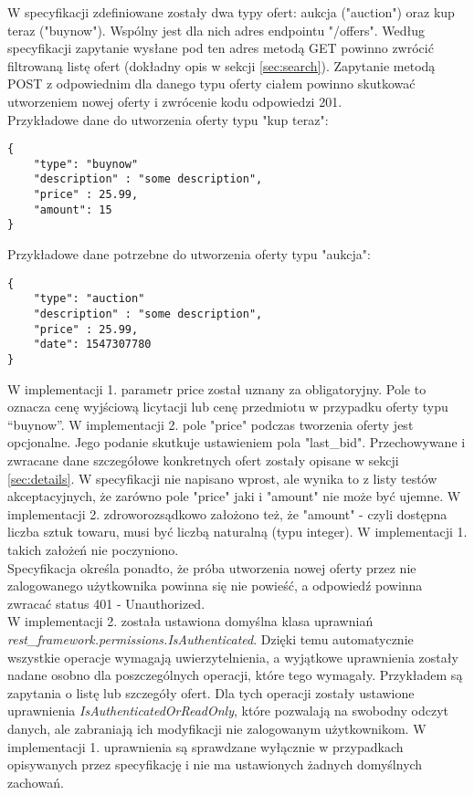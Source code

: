 \documentclass[12pt, notitlepage]{article}
\begin{document}
W specyfikacji zdefiniowane zostały dwa typy ofert: aukcja ("auction") oraz kup teraz ("buynow"). Wspólny jest dla nich adres endpointu "/offers". Według specyfikacji zapytanie wysłane pod ten adres metodą GET powinno zwrócić filtrowaną listę ofert (dokładny opis w sekcji \ref{sec:search}). Zapytanie metodą POST z odpowiednim dla danego typu oferty ciałem powinno skutkować utworzeniem nowej oferty i zwrócenie kodu odpowiedzi 201. \\

Przykładowe dane do utworzenia oferty typu "kup teraz":
\begin{lstlisting}
{     
    "type": "buynow"
    "description" : "some description",
    "price" : 25.99,
    "amount": 15
}
\end{lstlisting}

Przykładowe dane potrzebne do utworzenia oferty typu "aukcja":
\begin{lstlisting}
{     
    "type": "auction"
    "description" : "some description",
    "price" : 25.99,
    "date": 1547307780
}
\end{lstlisting}

W implementacji 1. parametr price został uznany za obligatoryjny. Pole to oznacza cenę wyjściową licytacji lub cenę przedmiotu w przypadku oferty typu ``buynow''. W implementacji 2. pole "price" podczas tworzenia oferty jest opcjonalne. Jego podanie skutkuje ustawieniem pola "last\_bid". Przechowywane i zwracane dane szczegółowe konkretnych ofert zostały opisane w sekcji \ref{sec:details}. W specyfikacji nie napisano wprost, ale wynika to z listy testów akceptacyjnych, że zarówno pole "price" jaki i "amount" nie może być ujemne. W implementacji 2. zdroworozsądkowo założono też, że "amount" - czyli dostępna liczba sztuk towaru, musi być liczbą naturalną (typu integer). W implementacji 1. takich założeń nie poczyniono. \\

Specyfikacja określa ponadto, że próba utworzenia nowej oferty przez nie zalogowanego użytkownika powinna się nie powieść, a odpowiedź powinna zwracać status 401 - Unauthorized. \\
W implementacji 2. została ustawiona domyślna klasa uprawniań \newline \textit{rest\_framework.permissions.IsAuthenticated}. Dzięki temu automatycznie wszystkie operacje wymagają uwierzytelnienia, a wyjątkowe uprawnienia zostały nadane osobno dla poszczególnych operacji, które tego wymagały. Przykładem są zapytania o listę lub szczegóły ofert. Dla tych operacji zostały ustawione uprawnienia \textit{IsAuthenticatedOrReadOnly}, które pozwalają na swobodny odczyt danych, ale zabraniają ich modyfikacji nie zalogowanym użytkownikom. W implementacji 1. uprawnienia są sprawdzane wyłącznie w przypadkach opisywanych przez specyfikację i nie ma ustawionych żadnych domyślnych zachowań.\\
\end{document}
